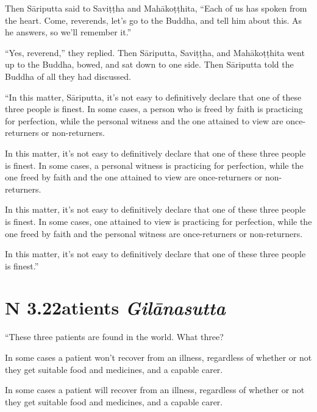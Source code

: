 \documentclass[12pt,openany]{book}%
\newcommand*{\suttatitleacronym}[1]{\smaller[2]{#1}\vspace*{.3em}}
\newcommand*{\suttatitletranslation}[1]{\linebreak{#1}}
\newcommand*{\suttatitleroot}[1]{\linebreak\smaller[2]\itshape{#1}}
\newcommand*{\tocacronym}[1]{\hspace*{-3.3em}{#1}\quad}
\newcommand*{\toctranslation}[1]{#1}
\newcommand*{\tocroot}[1]{(\textit{#1})}
\begin{document}
Then \textsanskrit{Sāriputta} said to \textsanskrit{Saviṭṭha} and \textsanskrit{Mahākoṭṭhita}, “Each of us has spoken from the heart. Come, reverends, let’s go to the Buddha, and tell him about this. As he answers, so we’ll remember it.” 

“Yes, reverend,” they replied. Then \textsanskrit{Sāriputta}, \textsanskrit{Saviṭṭha}, and \textsanskrit{Mahākoṭṭhita} went up to the Buddha, bowed, and sat down to one side. Then \textsanskrit{Sāriputta} told the Buddha of all they had discussed. 

“In this matter, \textsanskrit{Sāriputta}, it’s not easy to definitively declare that one of these three people is finest. In some cases, a person who is freed by faith is practicing for perfection, while the personal witness and the one attained to view are once-returners or non-returners. 

In this matter, it’s not easy to definitively declare that one of these three people is finest. In some cases, a personal witness is practicing for perfection, while the one freed by faith and the one attained to view are once-returners or non-returners. 

In this matter, it’s not easy to definitively declare that one of these three people is finest. In some cases, one attained to view is practicing for perfection, while the one freed by faith and the personal witness are once-returners or non-returners. 

In this matter, it’s not easy to definitively declare that one of these three people is finest.” 

%
\section*{{\suttatitleacronym AN 3.22}{\suttatitletranslation Patients }{\suttatitleroot Gilānasutta}}
\addcontentsline{toc}{section}{\tocacronym{AN 3.22} \toctranslation{Patients } \tocroot{Gilānasutta}}

“These three patients are found in the world. What three? 

In some cases a patient won’t recover from an illness, regardless of whether or not they get suitable food and medicines, and a capable carer. 

In some cases a patient will recover from an illness, regardless of whether or not they get suitable food and medicines, and a capable carer. 
\end{document}
